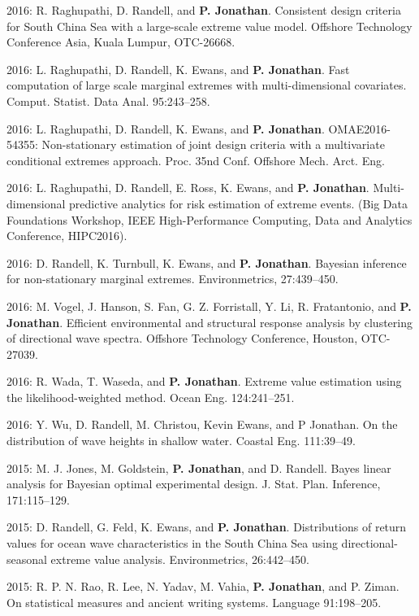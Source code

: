 \documentclass[11pt,a4paper]{moderncv}
\begin{document}
2016: R. Raghupathi, D. Randell, and \textbf{P. Jonathan}. Consistent design criteria for South China Sea with a large-scale extreme value model. Offshore Technology Conference Asia, Kuala Lumpur, OTC-26668.

2016: L. Raghupathi, D. Randell, K. Ewans, and \textbf{P. Jonathan}. Fast computation of large scale marginal extremes with multi-dimensional covariates. Comput. Statist. Data Anal. 95:243--258.

2016: L. Raghupathi, D. Randell, K. Ewans, and \textbf{P. Jonathan}. OMAE2016-54355: Non-stationary estimation of joint design criteria with a multivariate conditional extremes approach. Proc. 35nd Conf. Offshore Mech. Arct. Eng.

2016: L. Raghupathi, D. Randell, E. Ross, K. Ewans, and \textbf{P. Jonathan}. Multi-dimensional predictive analytics for risk estimation of extreme events. (Big Data Foundations Workshop, IEEE High-Performance Computing, Data and Analytics Conference, HIPC2016).

2016: D. Randell, K. Turnbull, K. Ewans, and \textbf{P. Jonathan}. Bayesian inference for non-stationary marginal extremes. Environmetrics, 27:439--450.

2016: M. Vogel, J. Hanson, S. Fan, G. Z. Forristall, Y. Li, R. Fratantonio, and \textbf{P. Jonathan}. Efficient environmental and structural response analysis by clustering of directional wave spectra. Offshore Technology Conference, Houston, OTC-27039.

2016: R. Wada, T. Waseda, and \textbf{P. Jonathan}. Extreme value estimation using the likelihood-weighted method. Ocean Eng. 124:241--251.

2016: Y. Wu, D. Randell, M. Christou, Kevin Ewans, and P Jonathan. On the distribution of wave heights in shallow water. Coastal Eng. 111:39--49.

2015: M. J. Jones, M. Goldstein, \textbf{P. Jonathan}, and D. Randell. Bayes linear analysis for Bayesian optimal experimental design. J. Stat. Plan. Inference, 171:115--129.

2015: D. Randell, G. Feld, K. Ewans, and \textbf{P. Jonathan}. Distributions of return values for ocean wave characteristics in the South China Sea using directional-seasonal extreme value analysis. Environmetrics, 26:442--450.

2015: R. P. N. Rao, R. Lee, N. Yadav, M. Vahia, \textbf{P. Jonathan}, and P. Ziman. On statistical measures and ancient writing systems. Language 91:198--205.
\end{document}
